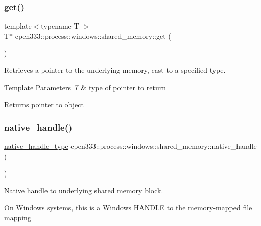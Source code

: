 \subsubsection{\texorpdfstring{get()}{get()}\hspace{0.1cm}{\footnotesize\ttfamily [3/3]}}
{\footnotesize\ttfamily template$<$typename T $>$ \\
T$\ast$ cpen333\+::process\+::windows\+::shared\+\_\+memory\+::get (\begin{DoxyParamCaption}{ }\end{DoxyParamCaption})\hspace{0.3cm}{\ttfamily [inline]}}



Retrieves a pointer to the underlying memory, cast to a specified type. 


\begin{DoxyTemplParams}{Template Parameters}
{\em T} & type of pointer to return \\
\hline
\end{DoxyTemplParams}
\begin{DoxyReturn}{Returns}
pointer to object 
\end{DoxyReturn}
\mbox{\label{classcpen333_1_1process_1_1windows_1_1shared__memory_a1827dd03341d7c6afcc02cf078f54e32}} 
\subsubsection{\texorpdfstring{native\+\_\+handle()}{native\_handle()}}
{\footnotesize\ttfamily \hyperlink{classcpen333_1_1process_1_1windows_1_1shared__memory_a4a2507680675101666846b0975fa6899}{native\+\_\+handle\+\_\+type} cpen333\+::process\+::windows\+::shared\+\_\+memory\+::native\+\_\+handle (\begin{DoxyParamCaption}{ }\end{DoxyParamCaption})\hspace{0.3cm}{\ttfamily [inline]}}



Native handle to underlying shared memory block. 

On Windows systems, this is a Windows H\+A\+N\+D\+LE to the memory-\/mapped file mapping

